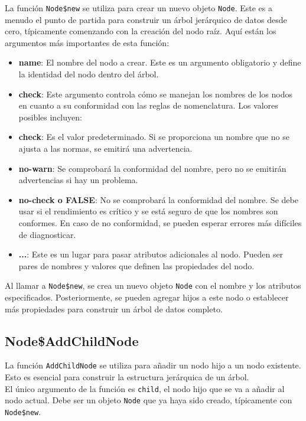 \documentclass[12pt]{report}\usepackage[]{graphicx}\usepackage[dvipsnames]{xcolor}
\begin{document}
 	La función \texttt{Node\$new} se utiliza para crear un nuevo objeto \texttt{Node}. Este es a menudo el punto de partida para construir un árbol jerárquico de datos desde cero, típicamente comenzando con la creación del nodo raíz. Aquí están los argumentos más importantes de esta función:
 	
 	\begin{itemize}
 		\item \textbf{name}: El nombre del nodo a crear. Este es un argumento obligatorio y define la identidad del nodo dentro del árbol.
 		\item \textbf{check}: Este argumento controla cómo se manejan los nombres de los nodos en cuanto a su conformidad con las reglas de nomenclatura. Los valores posibles incluyen:
 		\item \textbf{check}: Es el valor predeterminado. Si se proporciona un nombre que no se ajusta a las normas, se emitirá una advertencia.
 		\item \textbf{no-warn}: Se comprobará la conformidad del nombre, pero no se emitirán advertencias si hay un problema.
 		\item \textbf{no-check o FALSE}: No se comprobará la conformidad del nombre. Se debe usar si el rendimiento es crítico y se está seguro de que los nombres son conformes. En caso de no conformidad, se pueden esperar errores más difíciles de diagnosticar.
 		\item \textbf{...}: Este es un lugar para pasar atributos adicionales al nodo. Pueden ser pares de nombres y valores que definen las propiedades del nodo.
 	\end{itemize}
 	
 	Al llamar a \texttt{Node\$new}, se crea un nuevo objeto \texttt{Node} con el nombre y los atributos especificados. Posteriormente, se pueden agregar hijos a este nodo o establecer más propiedades para construir un árbol de datos completo.
 	
 	\subsection{Node\$AddChildNode}
 	
 	La función \texttt{AddChildNode} se utiliza para añadir un nodo hijo a un nodo existente. Esto es esencial para construir la estructura jerárquica de un árbol.\\
 	
 	El único argumento de la función es \texttt{child}, el nodo hijo que se va a añadir al nodo actual. Debe ser un objeto \texttt{Node} que ya haya sido creado, típicamente con \texttt{Node\$new}.\\
 	
\end{document}
